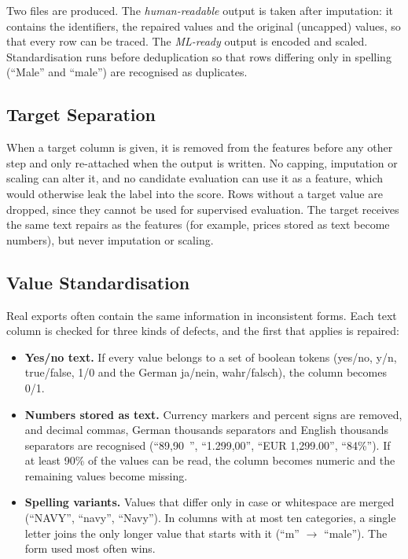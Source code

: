 \documentclass[11pt,a4paper]{article}
\begin{document}
Two files are produced. The \emph{human-readable} output is taken after imputation: it contains the identifiers, the repaired values and the original (uncapped) values, so that every row can be traced. The \emph{ML-ready} output is encoded and scaled. Standardisation runs before deduplication so that rows differing only in spelling (``Male'' and ``male'') are recognised as duplicates.

\subsection{Target Separation}

When a target column is given, it is removed from the features before any other step and only re-attached when the output is written. No capping, imputation or scaling can alter it, and no candidate evaluation can use it as a feature, which would otherwise leak the label into the score. Rows without a target value are dropped, since they cannot be used for supervised evaluation. The target receives the same text repairs as the features (for example, prices stored as text become numbers), but never imputation or scaling.

\subsection{Value Standardisation}

Real exports often contain the same information in inconsistent forms. Each text column is checked for three kinds of defects, and the first that applies is repaired:

\begin{itemize}
    \item \textbf{Yes/no text.} If every value belongs to a set of boolean tokens (yes/no, y/n, true/false, 1/0 and the German ja/nein, wahr/falsch), the column becomes 0/1.
    \item \textbf{Numbers stored as text.} Currency markers and percent signs are removed, and decimal commas, German thousands separators and English thousands separators are recognised (``89,90~\texteuro'', ``1.299,00'', ``EUR 1,299.00'', ``84\%''). If at least 90\% of the values can be read, the column becomes numeric and the remaining values become missing.
    \item \textbf{Spelling variants.} Values that differ only in case or whitespace are merged (``NAVY'', ``navy\textvisiblespace'', ``Navy''). In columns with at most ten categories, a single letter joins the only longer value that starts with it (``m'' $\rightarrow$ ``male''). The form used most often wins.
\end{itemize}
\end{document}
